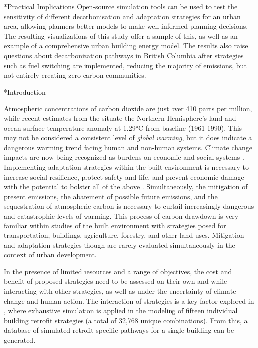 \documentclass[twocolumn, a4paper,10pt]{article}
\makeatletter
\renewcommand\section{\@startsection{section}{1}{\z@}{3pt}{3pt}{\normalfont\large\bfseries}}
\makeatother
\begin{document}
\section*{Practical Implications}
Open-source simulation tools can be used to test the sensitivity of different decarbonisation and adaptation strategies for an urban area, allowing planners better models to make well-informed planning decisions. The resulting visualizations of this study offer a sample of this, as well as an example of a comprehensive urban building energy model. The results also raise questions about decarbonization pathways in British Columbia after strategies such as fuel switching are implemented, reducing the majority of emissions, but not entirely creating zero-carbon communities. 

\section*{Introduction}

Atmospheric concentrations of carbon dioxide are just over 410 parts per million, while recent estimates from the \citet{noauthor_state_2020} situate the Northern Hemisphere’s land and ocean surface temperature anomaly at 1.29°C from baseline (1961-1990). This may not be considered a consistent level of \textit{global warming}, but it does indicate a dangerous warming trend facing human and non-human systems. Climate change impacts are now being recognized as burdens on economic and social systems \citep{frame_climate_2020}. Implementing adaptation strategies within the built environment is necessary to increase social resilience, protect safety and life, and prevent economic damage with the potential to bolster all of the above \citep{schunemann_mitigation_2020}. Simultaneously, the mitigation of present emissions, the abatement of possible future emissions, and the sequestration of atmospheric carbon is necessary to curtail increasingly dangerous and catastrophic levels of warming. This process of carbon drawdown is very familiar within studies of the built environment with strategies posed for transportation, buildings, agriculture, forestry, and other land-uses. Mitigation and adaptation strategies though are rarely evaluated simultaneously in the context of urban development.

In the presence of limited resources and a range of objectives, the cost and benefit of proposed strategies need to be assessed on their own and while interacting with other strategies, as well as under the uncertainty of climate change and human action. The interaction of strategies is a key factor explored in \citet{rysanek_using_2013}, where exhaustive simulation is applied in the modeling of fifteen individual building retrofit strategies (a total of 32,768 unique combinations). From this, a database of simulated retrofit-specific pathways for a single building can be generated.
\end{document}
